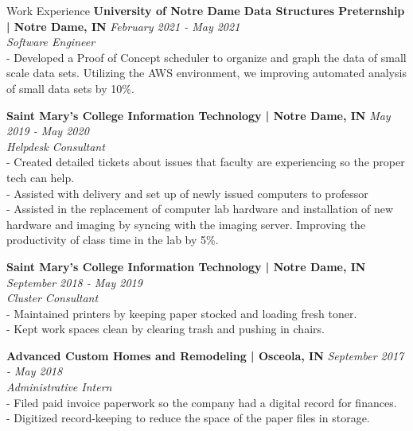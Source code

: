 \documentclass{resume} %
\begin{document}
\begin{rSection}{Work Experience}
{\bf University of Notre Dame Data Structures Preternship |  Notre Dame, IN} \hfill {\em February 2021 - May 2021}
\\{\textit{Software Engineer}}
\\ - Developed a Proof of Concept scheduler to organize and graph the data of small scale data sets. Utilizing the AWS environment, we improving automated analysis of small data sets by 10\%.

{\bf Saint Mary’s College Information Technology | Notre Dame, IN
} \hfill {\em May 2019 - May 2020}
\\{\textit{Helpdesk Consultant}}
\\ - Created detailed tickets about issues that faculty are experiencing so the proper tech can help.
\\ - Assisted with delivery and set up of newly issued computers to professor
\\ - Assisted in the replacement of computer lab hardware and installation of new hardware and imaging by syncing with the imaging server. Improving the productivity of class time in the lab by 5\%.

{\bf Saint Mary’s College Information Technology | Notre Dame, IN
} \hfill {\em September 2018 - May 2019}
\\{\textit{Cluster Consultant}}
\\ - Maintained printers by keeping paper stocked and loading fresh toner.
\\ - Kept work spaces clean by clearing trash and pushing in chairs.

{\bf Advanced Custom Homes and Remodeling | Osceola, IN} \hfill {\em September 2017 - May 2018}
\\{\textit{Administrative Intern}}
\\- Filed paid invoice paperwork so the company had a digital record for finances.
\\- Digitized record-keeping to reduce the space of the paper files in storage.

\newpage
\end{rSection}
\end{document}
